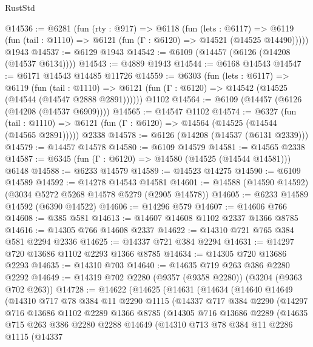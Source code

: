 \begin{lexlean}{RustStd}
\begin{coremodule}
@14536 := @6281
    (fun (rty : @917) =>
    @6118
      (fun (lets : @6117) =>
      @6119 (fun (tail : @1110) => @6121 (fun (Γ : @6120) => @14521 (@14525 @14490)))))
    @1943
@14537 := @6129 @1943
@14542 := @6109 (@14457 (@6126 (@14208 (@14537 @6134))))
@14543 := @4889 @1943
@14544 := @6168 @14543
@14547 := @6171 @14543 @14485 @11726
@14559 := @6303
    (fun (lets : @6117) =>
    @6119
      (fun (tail : @1110) =>
      @6121 (fun (Γ : @6120) => @14542 (@14525 (@14544 (@14547 @2888 @2891))))))
    @1102
@14564 := @6109 (@14457 (@6126 (@14208 (@14537 @6909))))
@14565 := @14547 @1102
@14574 := @6327
    (fun (tail : @1110) => @6121 (fun (Γ : @6120) => @14564 (@14525 (@14544 (@14565 @2891)))))
    @2338
@14578 := @6126 (@14208 (@14537 (@6131 @2339)))
@14579 := @14457 @14578
@14580 := @6109 @14579
@14581 := @14565 @2338
@14587 := @6345 (fun (Γ : @6120) => @14580 (@14525 (@14544 @14581))) @6148
@14588 := @6233 @14579
@14589 := @14523 @14275
@14590 := @6109 @14589
@14592 := @14278 @14543 @14581
@14601 := @14588 (@14590 @14592) (@3034 @5272 @5268 @14578 @5279 (@2905 @14578))
@14605 := @6233 @14589 @14592 (@6390 @14522)
@14606 := @14296 @579
@14607 := @14606 @766
@14608 := @385 @581
@14613 := @14607 @14608 @1102 @2337 @1366 @8785
@14616 := @14305 @766 @14608 @2337
@14622 := @14310 @721 @765 @384 @581 @2294 @2336
@14625 := @14337 @721 @384 @2294
@14631 := @14297 @720 @13686 @1102 @2293 @1366 @8785
@14634 := @14305 @720 @13686 @2293
@14635 := @14310 @703
@14640 := @14635 @719 @263 @386 @2280 @2292
@14649 := @14319 @702 @2280 (@9357 (@9358 @2280)) (@3204 (@9363 @702 @263))
@14728 := @14622
    (@14625
      (@14631
        (@14634
          (@14640
            @14649
            (@14310
              @717
              @78
              @384
              @11
              @2290
              @1115
              (@14337
                @717
                @384
                @2290
                (@14297
                  @716
                  @13686
                  @1102
                  @2289
                  @1366
                  @8785
                  (@14305
                    @716
                    @13686
                    @2289
                    (@14635
                      @715
                      @263
                      @386
                      @2280
                      @2288
                      @14649
                      (@14310
                        @713
                        @78
                        @384
                        @11
                        @2286
                        @1115
                        (@14337

\end{coremodule}
\end{lexlean}
